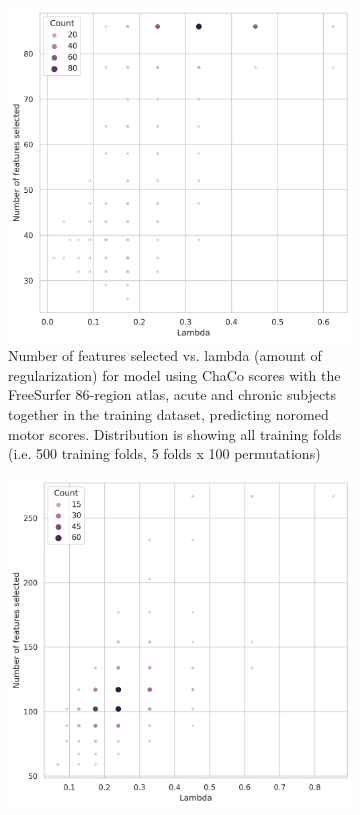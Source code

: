\documentclass[10pt]{article}
\begin{document}
\begin{figure}
\begin{subfigure}{0.5\textwidth}
  \includegraphics[width=1\linewidth]{figures/fs86subj_normed_motor_scores_chacovol_acutechronic_ridge_crossval1nfeats_lambdas.png}
  \caption{Number of features selected vs. lambda (amount of regularization) for model using ChaCo scores with the FreeSurfer 86-region atlas, acute and chronic subjects together in the training dataset, predicting noromed motor scores. Distribution is showing all training folds (i.e. 500 training folds, 5 folds x 100 permutations)}
  \label{fig:sfig1}
\end{subfigure}
\begin{subfigure}{0.5\textwidth}
  \includegraphics[width=1\linewidth]{figures/shen268_normed_motor_scores_chacovol_acutechronic_ridge_crossval1nfeats_lambdas.png}

\end{subfigure}
\end{figure}
\end{document}
